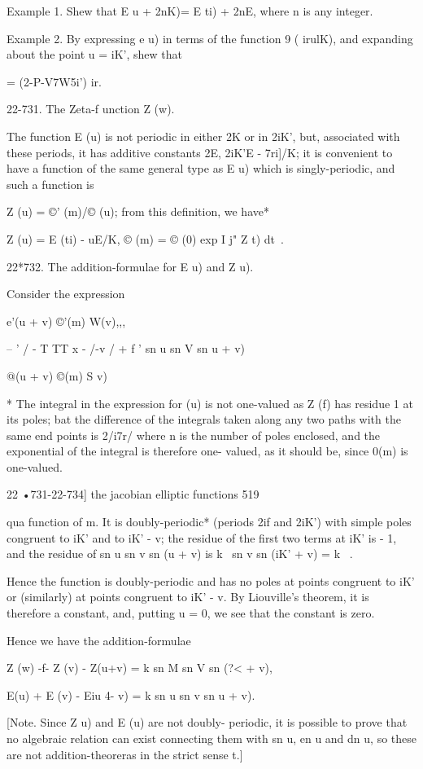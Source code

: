 Example 1. Shew that E u + 2nK)= E ti) + 2nE, where n is any integer.

Example 2. By expressing e u) in terms of the function 9 ( irulK), and
expanding about the point u = iK', shew that

 = (2-P-V7W5i') ir.

22-731. The Zeta-f unction Z (w).

The function E (u) is not periodic in either 2K or in 2iK', but,
associated with these periods, it has additive constants 2E, 2iK'E -
7ri]/K; it is convenient to have a function of the same general type
as E u) which is singly-periodic, and such a function is

Z (u) = ©' (m)/© (u); from this definition, we have*

Z (u) = E (ti) - uE/K, © (m) = © (0) exp I j" Z t) dt\ .

22*732. The addition-formulae for E u) and Z u).

Consider the expression

e'(u + v) ©'(m) W(v),,,

-- ' / - T TT x - /-v / + f ' sn u sn V sn u + v)

@(u + v) ©(m) S v)

* The integral in the expression for (u) is not one-valued as Z (f)
has residue 1 at its poles; bat the difference of the integrals taken
along any two paths with the same end points is 2/i7r/ where n is the
number of poles enclosed, and the exponential of the integral is
therefore one- valued, as it should be, since 0(m) is one-valued.

22 •731-22-734] the jacobian elliptic functions 519

qua function of m. It is doubly-periodic* (periods 2if and 2iK') with
simple poles congruent to iK' and to iK' - v; the residue of the
first two terms at iK' is - 1, and the residue of sn u sn v sn (u + v)
is k~ sn v sn (iK' + v) = k~ .

Hence the function is doubly-periodic and has no poles at points
congruent to iK' or (similarly) at points congruent to iK' - v. By
Liouville's theorem, it is therefore a constant, and, putting u = 0,
we see that the constant is zero.

Hence we have the addition-formulae

Z (w) -f- Z (v) - Z(u+v) = k sn M sn V sn (?< + v),

E(u) + E (v) - Eiu 4- v) = k sn u sn v sn u + v).

[Note. Since Z u) and E (u) are not doubly- periodic, it is possible
to prove that no algebraic relation can exist connecting them with sn
u, en u and dn u, so these are not addition-theoreras in the strict
sense t.]

